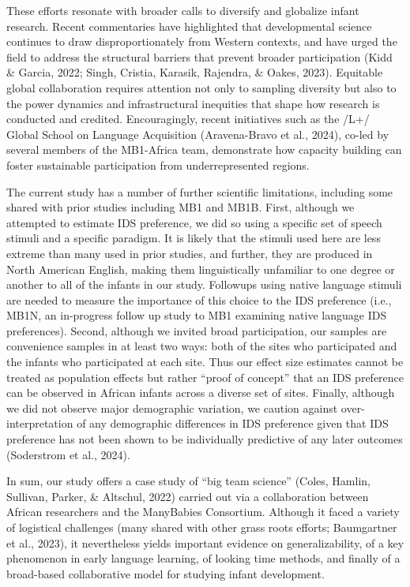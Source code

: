 \documentclass[
  ,man,floatsintext]{apa6}
\begin{document}
These efforts resonate with broader calls to diversify and globalize infant research. Recent commentaries have highlighted that developmental science continues to draw disproportionately from Western contexts, and have urged the field to address the structural barriers that prevent broader participation (Kidd \& Garcia, 2022; Singh, Cristia, Karasik, Rajendra, \& Oakes, 2023). Equitable global collaboration requires attention not only to sampling diversity but also to the power dynamics and infrastructural inequities that shape how research is conducted and credited. Encouragingly, recent initiatives such as the /L+/ Global School on Language Acquisition (Aravena-Bravo et al., 2024), co-led by several members of the MB1-Africa team, demonstrate how capacity building can foster sustainable participation from underrepresented regions.

The current study has a number of further scientific limitations, including some shared with prior studies including MB1 and MB1B. First, although we attempted to estimate IDS preference, we did so using a specific set of speech stimuli and a specific paradigm. It is likely that the stimuli used here are less extreme than many used in prior studies, and further, they are produced in North American English, making them linguistically unfamiliar to one degree or another to all of the infants in our study. Followups using native language stimuli are needed to measure the importance of this choice to the IDS preference (i.e., MB1N, an in-progress follow up study to MB1 examining native language IDS preferences). Second, although we invited broad participation, our samples are convenience samples in at least two ways: both of the sites who participated and the infants who participated at each site. Thus our effect size estimates cannot be treated as population effects but rather ``proof of concept'' that an IDS preference can be observed in African infants across a diverse set of sites. Finally, although we did not observe major demographic variation, we caution against over-interpretation of any demographic differences in IDS preference given that IDS preference has not been shown to be individually predictive of any later outcomes (Soderstrom et al., 2024).

In sum, our study offers a case study of ``big team science'' (Coles, Hamlin, Sullivan, Parker, \& Altschul, 2022) carried out via a collaboration between African researchers and the ManyBabies Consortium. Although it faced a variety of logistical challenges (many shared with other grass roots efforts; Baumgartner et al., 2023), it nevertheless yields important evidence on generalizability, of a key phenomenon in early language learning, of looking time methods, and finally of a broad-based collaborative model for studying infant development.
\end{document}
